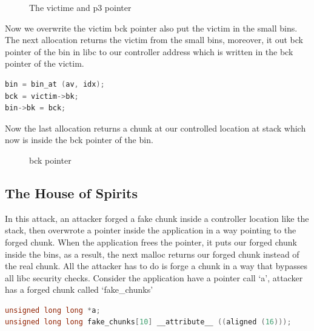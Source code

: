 \documentclass{masterthesis}
\newcommand*\sbs{small bins}
\begin{document}
\begin{figure}[h!]
  \caption{The victime and p3 pointer}
\end{figure}

Now we overwrite the victim bck pointer also put the victim in the \sbs{}. The next allocation returns the victim from the \sbs{}, moreover, it out bck pointer of the bin in libc to our controller address which is written in the bck pointer of the victim.

\begin{lstlisting}[language=c,frame=tlrb]
bin = bin_at (av, idx);
bck = victim->bk;
bin->bk = bck;
\end{lstlisting}

Now the last allocation returns a chunk at our controlled location at stack which now is inside the bck pointer of the bin. 

\begin{figure}[h!]
  \caption{bck pointer}
\end{figure}

\subsection{The House of Spirits}
In this attack, an attacker forged a fake chunk inside a controller location like the stack, then overwrote a pointer inside the application in a way pointing to the forged chunk. When the application frees the pointer, it puts our forged chunk inside the bins, as a result, the next malloc returns our forged chunk instead of the real chunk. All the attacker has to do is forge a chunk in a way that bypasses all libc security checks. Consider the application have a pointer call ‘a’, attacker has a forged chunk called ‘fake\_chunks’

\begin{lstlisting}[language=c,frame=tlrb]
unsigned long long *a;
unsigned long long fake_chunks[10] __attribute__ ((aligned (16)));
\end{lstlisting}
\end{document}
